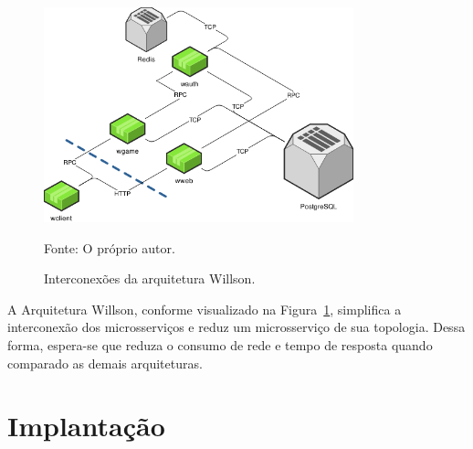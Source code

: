\begin{figure}[htb!]
  \caption{Interconexões da arquitetura Willson.}
  \label{fig:interconexao_willson}
  \includegraphics[width=0.8\textwidth]{figuras/interconexoes/willson.png}
  \centering

  Fonte: O próprio autor.
\end{figure}



A Arquitetura Willson, conforme visualizado na Figura~\ref{fig:interconexao_willson}, simplifica a interconexão dos microsserviços e reduz um microsserviço de sua topologia.
%
Dessa forma, espera-se que reduza o consumo de rede e tempo de resposta quando comparado as demais arquiteturas.



\section{Implantação}
\label{sec:implantacao}
